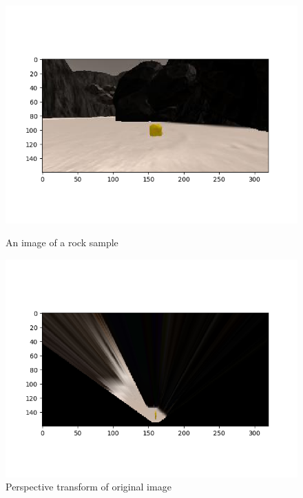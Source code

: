 \documentclass[a4paper]{article}
\begin{document}
\begin{figure}[h]
\centering
\begin{minipage}[t]{0.45\linewidth}
\centering
\includegraphics[scale=0.45]{image15}
\vspace{-1.5cm}
\caption{An image of a rock sample}
\end{minipage}
\hspace{0.5cm}
\begin{minipage}[t]{0.45\linewidth}
\centering
\includegraphics[scale=0.45]{image16}
\vspace{-1.5cm}
\caption{Perspective transform of original image}
\end{minipage}
\end{figure}
\end{document}
